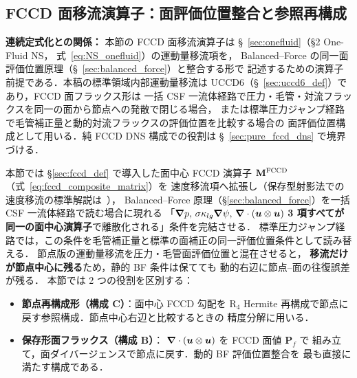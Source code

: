 %
%
\subsection{FCCD 面移流演算子：面評価位置整合と参照再構成}
\label{sec:fccd_advection}

\noindent\textbf{連続定式化との関係：}
本節の FCCD 面移流演算子は §~\ref{sec:onefluid}（§2 One-Fluid NS，
式~\eqref{eq:NS_onefluid}）の運動量移流項を，
Balanced--Force の同一面評価位置原理（§~\ref{sec:balanced_force}）と整合する形で
記述するための演算子前提である．本稿の標準領域内部運動量移流は
UCCD6（§~\ref{sec:uccd6_def}）であり，FCCD 面フラックス形は
一括 CSF 一流体経路で圧力・毛管・対流フラックスを同一の面から節点への発散で閉じる場合，
または標準圧力ジャンプ経路で毛管補正量と動的対流フラックスの評価位置を比較する場合の
面評価位置構成として用いる．純 FCCD DNS 構成での役割は §~\ref{sec:pure_fccd_dns} で境界づける．

本節では \S\ref{sec:fccd_def} で導入した面中心 FCCD 演算子
$\mathbf{M}^{\mathrm{FCCD}}$（式~\eqref{eq:fccd_composite_matrix}）を
速度移流項へ拡張し（保存型射影法での速度移流の標準解説は~\cite{BellColella1989}），
Balanced--Force 原理（\S\ref{sec:balanced_force}）を一括 CSF 一流体経路で読む場合に現れる
「$\bm{\nabla} p,\,\sigma\kappa_{lg}\bm{\nabla}\psi,\,\bm{\nabla}\cdot(\bm{u}\otimes\bm{u})$
\textbf{3 項すべてが同一の面中心演算子}で離散化される」条件を完結させる．
標準圧力ジャンプ経路では，この条件を毛管補正量と標準の面補正の同一評価位置条件として読み替える．
節点版の運動量移流を圧力・毛管面評価位置と混在させると，
\textbf{移流だけが節点中心に残る}ため，静的 BF 条件は保てても
動的右辺に節点--面の往復誤差が残る．
本節では 2 つの役割を区別する：
\begin{itemize}
  \item \textbf{節点再構成形（構成 C）}：面中心 FCCD 勾配を R$_4$
        Hermite 再構成で節点に戻す参照構成．節点中心右辺と比較するときの
        精度分解に用いる．
  \item \textbf{保存形面フラックス（構成 B）}：
        $\bm{\nabla}\cdot(\bm{u}\otimes\bm{u})$ を FCCD 面値 $\mathbf{P}_f$ で
        組み立て，面ダイバージェンスで節点に戻す．動的 BF 評価位置整合を
        最も直接に満たす構成である．
\end{itemize}

